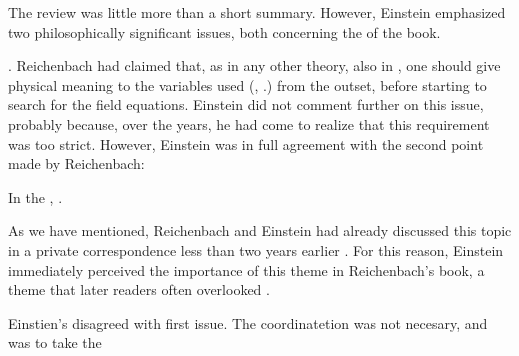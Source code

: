 \documentclass[draft]{article}
\begin{document}
The review was little more than a short summary. However, Einstein emphasized two philosophically significant issues, both concerning the \Ap of the book. \begin{inparaenum}[(1)] \item {} \citep[20\me]{Einstein1928d}. Reichenbach had claimed that, as in any other  theory, also in \uft, one should give physical meaning to the variables used (\gmn, \Gtmn\etc.) from the outset, before starting to search for the field equations. Einstein did not comment further on this issue, probably because, over the years, he had come to realize that this requirement was too strict. However, Einstein was in full agreement with the second point made by Reichenbach: \item In the \Ap,  \citep[20\me]{Einstein1928d}. \end{inparaenum} As we have mentioned, Reichenbach and Einstein had already discussed this topic in a private correspondence less than two years earlier . For this reason, Einstein immediately perceived the importance of this theme in Reichenbach's book, a theme that later readers often overlooked . 

Einstien's disagreed with first issue. The coordinatetion was not necesary, and was to take the \Gtmn
\end{document}
